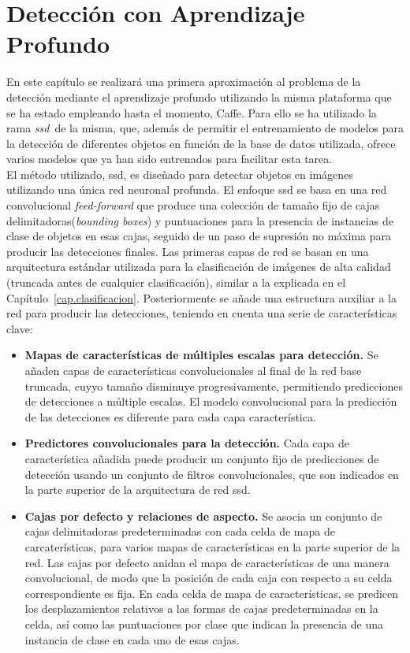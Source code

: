 \chapter{Detección con Aprendizaje Profundo}\label{cap.deteccion}
En este capítulo se realizará una primera aproximación al problema de la detección mediante el aprendizaje profundo utilizando la misma plataforma que se ha estado empleando hasta el momento, Caffe. Para ello se ha utilizado la rama \textit{\acrfull{ssd}}~\cite{liu2016ssd}de la misma, que, además de permitir el entrenamiento de modelos para la detección de diferentes objetos en función de la base de datos utilizada, ofrece varios modelos que ya han sido entrenados para facilitar esta tarea.\\

El método utilizado, \acrshort{ssd}, es diseñado para detectar objetos en imágenes utilizando una única red neuronal profunda. El enfoque \acrshort{ssd} se basa en una red convolucional \textit{feed-forward} que produce una colección de tamaño fijo de cajas delimitadoras(\textit{bounding boxes}) y puntuaciones para la presencia de instancias de clase de objetos en esas cajas, seguido de un paso de supresión no máxima para producir las detecciones finales. Las primeras capas de red se basan en una arquitectura estándar utilizada para la clasificación de imágenes de alta calidad (truncada antes de cualquier clasificación), similar a la explicada en el Capítulo~\ref{cap.clasificacion}. Posteriormente se añade una estructura auxiliar a la red para producir las detecciones, teniendo en cuenta una serie de características clave:
\begin{itemize}
	\item \textbf{Mapas de características de múltiples escalas para detección.} Se añaden capas de características convolucionales al final de la red base truncada, cuyyo tamaño disminuye progresivamente, permitiendo predicciones de detecciones a múltiple escalas. El modelo convolucional para la predicción de las detecciones es diferente para cada capa característica.
	\vspace{10pt}
	\item \textbf{Predictores convolucionales para la detección.} Cada capa de característica añadida puede producir un conjunto fijo de predicciones de detección usando un conjunto de filtros convolucionales, que son indicados en la parte superior de la arquitectura de red \acrshort{ssd}.
	\item \textbf{Cajas por defecto y relaciones de aspecto.} Se asocia un conjunto de cajas delimitadoras predeterminadas con cada celda de mapa de carcaterísticas, para varios mapas de características en la parte superior de la red. Las cajas por defecto anidan el mapa de características de una manera convolucional, de modo que la posición de cada caja con respecto a su celda correspondiente es fija. En cada celda de mapa de características, se predicen los desplazamientos relativos a las formas de cajas predeterminadas en la celda, así como las puntuaciones por clase que indican la presencia de una instancia de clase en cada uno de esas cajas.
\end{itemize}

